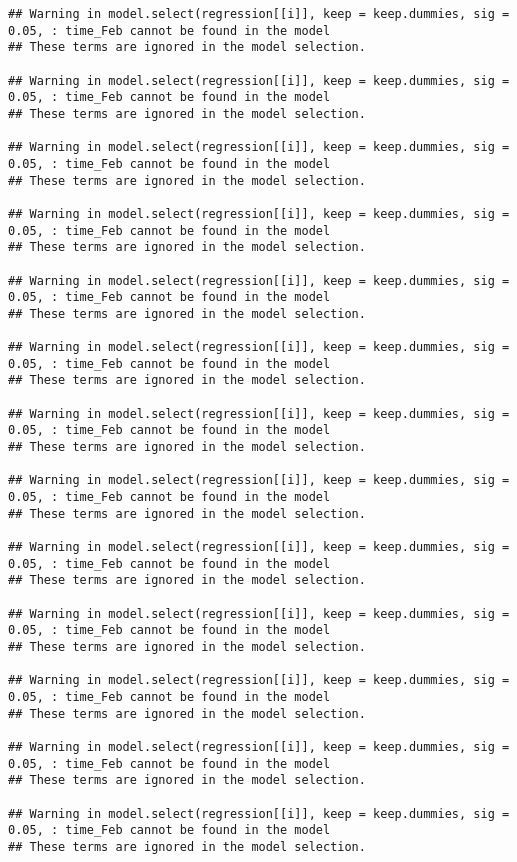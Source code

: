\documentclass[
]{article}
\begin{document}
\begin{verbatim}
## Warning in model.select(regression[[i]], keep = keep.dummies, sig = 0.05, : time_Feb cannot be found in the model 
## These terms are ignored in the model selection.

## Warning in model.select(regression[[i]], keep = keep.dummies, sig = 0.05, : time_Feb cannot be found in the model 
## These terms are ignored in the model selection.

## Warning in model.select(regression[[i]], keep = keep.dummies, sig = 0.05, : time_Feb cannot be found in the model 
## These terms are ignored in the model selection.

## Warning in model.select(regression[[i]], keep = keep.dummies, sig = 0.05, : time_Feb cannot be found in the model 
## These terms are ignored in the model selection.

## Warning in model.select(regression[[i]], keep = keep.dummies, sig = 0.05, : time_Feb cannot be found in the model 
## These terms are ignored in the model selection.

## Warning in model.select(regression[[i]], keep = keep.dummies, sig = 0.05, : time_Feb cannot be found in the model 
## These terms are ignored in the model selection.

## Warning in model.select(regression[[i]], keep = keep.dummies, sig = 0.05, : time_Feb cannot be found in the model 
## These terms are ignored in the model selection.

## Warning in model.select(regression[[i]], keep = keep.dummies, sig = 0.05, : time_Feb cannot be found in the model 
## These terms are ignored in the model selection.

## Warning in model.select(regression[[i]], keep = keep.dummies, sig = 0.05, : time_Feb cannot be found in the model 
## These terms are ignored in the model selection.

## Warning in model.select(regression[[i]], keep = keep.dummies, sig = 0.05, : time_Feb cannot be found in the model 
## These terms are ignored in the model selection.

## Warning in model.select(regression[[i]], keep = keep.dummies, sig = 0.05, : time_Feb cannot be found in the model 
## These terms are ignored in the model selection.

## Warning in model.select(regression[[i]], keep = keep.dummies, sig = 0.05, : time_Feb cannot be found in the model 
## These terms are ignored in the model selection.

## Warning in model.select(regression[[i]], keep = keep.dummies, sig = 0.05, : time_Feb cannot be found in the model 
## These terms are ignored in the model selection.


\end{verbatim}
\end{document}
